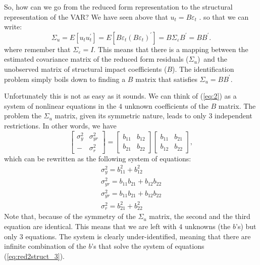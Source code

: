 \documentclass[10pt]{article}
\begin{document}
So, how can we go from the reduced form representation to the structural
representation of the VAR? We have seen above that $u_{t}=B\varepsilon _{t}$%
. so that we can write:%
\begin{equation}
\Sigma _{u}=E\left[ u_{t}u_{t}^{\prime }\right] =E\left[ B\varepsilon
_{t}\left( B\varepsilon _{t}\right) ^{\prime }\right] =B\Sigma _{\varepsilon
}B^{\prime }=BB^{\prime }.  \label{eq:red2struct_1}
\end{equation}%
where remember that $\Sigma _{\varepsilon }=I$. This means that there is a
mapping between the estimated covariance matrix of the reduced form
residuals ($\Sigma _{u}$)\ and the unobserved matrix of structural impact
coefficients ($B$). The identification problem simply boils down to finding
a $B$ matrix that satisfies $\Sigma _{u}=BB^{\prime }$.

Unfortunately this is not as easy as it sounds. We can think of (\ref{eq:2})
as a system of nonlinear equations in the $4$ unknown coefficients of the $B$
matrix. The problem the $\Sigma _{u}$ matrix, given its symmetric nature,
leads to only $3$ independent restrictions. In other words, we have
\begin{equation}
\left[
\begin{array}{cc}
\sigma _{y}^{2} & \sigma _{yr}^{2} \\
- & \sigma _{r}^{2}%
\end{array}%
\right] =\left[
\begin{array}{cc}
b_{11} & b_{12} \\
b_{21} & b_{22}%
\end{array}%
\right] \left[
\begin{array}{cc}
b_{11} & b_{21} \\
b_{12} & b_{22}%
\end{array}%
\right] ,  \label{eq:red2struct_2}
\end{equation}%
which can be rewritten as the following system of equations:%
\begin{equation}
\begin{array}{l}
\sigma _{y}^{2}=b_{11}^{2}+b_{12}^{2} \\
\sigma _{yr}^{2}=b_{11}b_{21}+b_{12}b_{22} \\
\sigma _{yr}^{2}=b_{11}b_{21}+b_{12}b_{22} \\
\sigma _{r}^{2}=b_{21}^{2}+b_{22}^{2}%
\end{array}
\label{eq:red2struct_3}
\end{equation}%
Note that, because of the symmetry of the $\Sigma _{u}$ matrix, the second
and the third equation are identical. This means that we are left with $4$
unknowns (the $b$'s) but only $3$ equations. The system is clearly
under-identified, meaning that there are infinite combination of the $b$'s
that solve the system of equations (\ref{eq:red2struct_3}).
\end{document}
